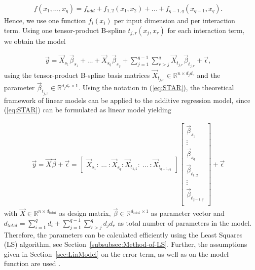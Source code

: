 \documentclass[10pt,a4paper]{report}
\begin{document}
\begin{align} \label{eq:addRegBaseEquation-with-interaction}
	f(x_1, \dots, x_q) = f_{add} + f_{1,2}(x_1, x_2) + \dots + f_{q-1, q}(x_{q-1},x_q).
\end{align}
%
Hence, we use one function $f_i(x_i)$ per input dimension and per interaction term. Using one tensor-product B-spline $t_{j,r}(x_j, x_r)$ for each interaction term, we obtain the model

\begin{align} \label{eq:STAR}
	\vec{y} = \vec{X}_{s_1} \vec{\beta}_{s_1} + \dots + \vec{X}_{s_q} \vec{\beta}_{s_q} + \sum_{j=1}^{q-1} \sum_{r>j}^{q} \vec{X}_{t_{j, r}} \vec{\beta}_{t_{j, r}} + \vec{\epsilon},
\end{align}
%
using the tensor-product B-spline basis matrices $\vec{X}_{t_{j,r}} \in \mathbb{R}^{n \times d_j d_r}$ and the parameter $\vec{\beta}_{t_{j, r}} \in \mathbb{R}^{d_j d_r \times 1}$. Using the notation in (\ref{eq:STAR}), the theoretical framework of linear models can be applied to the additive regression model, since (\ref{eq:STAR}) can be formulated as linear model yielding

\begin{align} \label{eq:STAR-block-diag}
	\vec{y} = \vec{X} \vec{\beta} + \vec{\epsilon} = 
	\begin{bmatrix}
		\vec{X}_{s_1} \colon \ \dots \ \colon \vec{X}_{s_q} \colon \vec{X}_{t_{1,2}} \colon \ \dots  \ \colon \vec{X}_{t_{q-1, q}}    
	\end{bmatrix} \begin{bmatrix} \vec{\beta}_{s_1} \\ 
								  \vdots \\ 
								  \vec{\beta}_{s_q} \\ 
								  \vec{\beta}_{t_{1,2}} \\ 
								  \vdots \\ 
								  \vec{\beta}_{t_{q-1, q}} \\
	\end{bmatrix} + \vec{\epsilon}
\end{align}
%
with $\vec{X} \in \mathbb{R}^{n \times d_{total}}$ as design matrix, $\vec{\beta} \in \mathbb{R}^{d_{total} \times 1}$ as parameter vector and $d_{total} = \sum_{i=1}^q d_i + \sum_{j=1}^{q-1} \sum_{r>j}^q d_j d_r$ as total number of parameters in the model. Therefore, the parameters can be calculated efficiently using the Least Squares (LS) algorithm, see Section~\ref{subsubsec:Method-of-LS}. Further, the assumptions given in Section~\ref{sec:LinModel} on the error term, as well as on the model function are used \cite{fahrmeir2007regression}.
\end{document}
